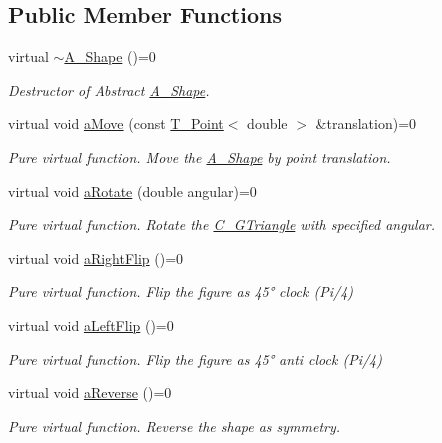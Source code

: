 \subsection*{Public Member Functions}
\begin{DoxyCompactItemize}
\item 
virtual \hyperlink{classA__Shape_ad0a3bcb28f3d4f42043ea8c592bb5f1f}{$\sim$\+A\+\_\+\+Shape} ()=0
\begin{DoxyCompactList}\small\item\em Destructor of Abstract \hyperlink{classA__Shape}{A\+\_\+\+Shape}. \end{DoxyCompactList}\item 
virtual void \hyperlink{classA__Shape_ab284298db1b557ccfa7ba6de7a5fee2c}{a\+Move} (const \hyperlink{classT__Point}{T\+\_\+\+Point}$<$ double $>$ \&translation)=0
\begin{DoxyCompactList}\small\item\em Pure virtual function. Move the \hyperlink{classA__Shape}{A\+\_\+\+Shape} by point translation. \end{DoxyCompactList}\item 
virtual void \hyperlink{classA__Shape_a25b4e0c34cdb46da5382fe9c7467efaf}{a\+Rotate} (double angular)=0
\begin{DoxyCompactList}\small\item\em Pure virtual function. Rotate the \hyperlink{classC__GTriangle}{C\+\_\+\+G\+Triangle} with specified angular. \end{DoxyCompactList}\item 
virtual void \hyperlink{classA__Shape_a892688cbbad3297e00e87cce0dbfc76d}{a\+Right\+Flip} ()=0
\begin{DoxyCompactList}\small\item\em Pure virtual function. Flip the figure as 45° clock (Pi/4) \end{DoxyCompactList}\item 
virtual void \hyperlink{classA__Shape_abe947e7003cb63be2b4f6c439533427d}{a\+Left\+Flip} ()=0
\begin{DoxyCompactList}\small\item\em Pure virtual function. Flip the figure as 45° anti clock (Pi/4) \end{DoxyCompactList}\item 
virtual void \hyperlink{classA__Shape_afe2c7969d647f6358da13879a7534ecb}{a\+Reverse} ()=0
\begin{DoxyCompactList}\small\item\em Pure virtual function. Reverse the shape as symmetry. \end{DoxyCompactList}\item 

\end{DoxyCompactItemize}
